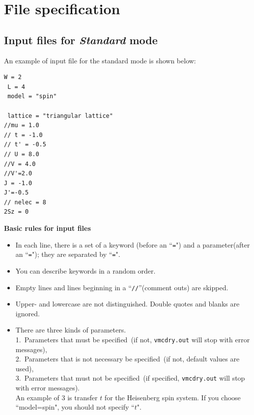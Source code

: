 \chapter{File specification}

\section{Input files for {\it Standard} mode}
\label{Ch:HowToStandard}

An example of input file for the standard mode is shown below:

\begin{minipage}{10cm}
\begin{screen}
\begin{verbatim}
W = 2
 L = 4
 model = "spin"

 lattice = "triangular lattice"
//mu = 1.0
// t = -1.0
// t' = -0.5
// U = 8.0
//V = 4.0
//V'=2.0
J = -1.0
J'=-0.5
// nelec = 8
2Sz = 0
\end{verbatim}
\end{screen}
\end{minipage}

{\bf Basic rules for input files}
\begin{itemize}
\item In each line, there is a set of a keyword (before an ``\verb|=|") and a parameter(after an ``\verb|=|"); 
  they are separated by ``\verb|=|".
\item You can describe keywords in a random order.
\item Empty lines and lines beginning in a ``\verb|//|''(comment outs) are skipped.
\item Upper- and lowercase are not distinguished.
  Double quotes and blanks are ignored.
\item There are three kinds of parameters.\\ 
  1.~Parameters that must be specified~(if not, \verb|vmcdry.out| will stop with error messages),\\ 
  2.~Parameters that is not necessary be specified~(if not, default values are used),\\
  3.~Parameters that must not be specified~(if specified, \verb|vmcdry.out| will stop with error messages).\\
  An example of 3 is transfer $t$ for the Heisenberg spin system. 
  If you choose ``model=spin", you should not specify ``$t$".
\end{itemize}


